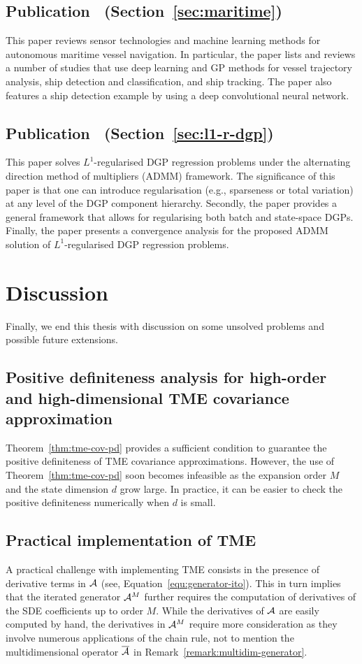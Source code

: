 \subsection*{Publication~ (Section~\ref{sec:maritime})}
This paper reviews sensor technologies and machine learning methods for autonomous maritime vessel navigation. In particular, the paper lists and reviews a number of studies that use deep learning and GP methods for vessel trajectory analysis, ship detection and classification, and ship tracking. The paper also features a ship detection example by using a deep convolutional neural network. 

\subsection*{Publication~ (Section~\ref{sec:l1-r-dgp})}
This paper solves $L^1$-regularised DGP regression problems under the alternating direction method of multipliers (ADMM) framework. The significance of this paper is that one can introduce regularisation (e.g., sparseness or total variation) at any level of the DGP component hierarchy. Secondly, the paper provides a general framework that allows for regularising both batch and state-space DGPs. Finally, the paper presents a convergence analysis for the proposed ADMM solution of $L^1$-regularised DGP regression problems.

\section{Discussion}
Finally, we end this thesis with discussion on some unsolved problems and possible future extensions.

\subsection*{Positive definiteness analysis for high-order and high-dimensional TME covariance approximation}
Theorem~\ref{thm:tme-cov-pd} provides a sufficient condition to guarantee the positive definiteness of TME covariance approximations. However, the use of Theorem~\ref{thm:tme-cov-pd} soon becomes infeasible as the expansion order $M$ and the state dimension $d$ grow large. In practice, it can be easier to check the positive definiteness numerically when $d$ is small. 

\subsection*{Practical implementation of TME}
A practical challenge with implementing TME consists in the presence of derivative terms in $\mathcal{A}$ (see, Equation~\eqref{equ:generator-ito}). This in turn implies that the iterated generator $\mathcal{A}^M$ further requires the computation of derivatives of the SDE coefficients up to order $M$. While the derivatives of $\mathcal{A}$ are easily computed by hand, the derivatives in $\mathcal{A}^M$ require more consideration as they involve numerous applications of the chain rule, not to mention the multidimensional operator $\overline{\mathcal{A}}$ in Remark~\ref{remark:multidim-generator}.

